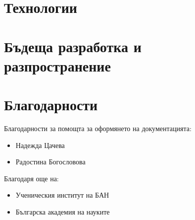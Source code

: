 \documentclass[a4paper,12pt]{article}
\begin{document}
	\section{Технологии}
	    
	\section{Бъдеща разработка и разпространение}
	    
	\section{Благодарности}
    	Благодарности за помощта за оформянето на документацията:
    	\begin{itemize}
    		\item Надежда Цачева
    		\item Радостина Богословова
    	\end{itemize}
    	Благодаря още на:
    	\begin{itemize}
    		\item Ученическия институт на БАН
    		\item Българска академия на науките
    	\end{itemize}

    
    
	
\end{document}
